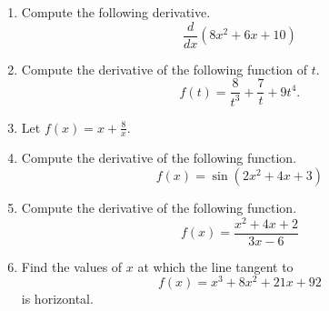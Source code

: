 \documentclass{article}
\begin{document}
\ActivityTitle[class=Calculus I, number=3, name=Differentiation I]

\begin{enumerate}
\item Compute the following derivative. \[ \frac{d}{dx} \left( 8 x^2 + 6 x + 10 \right) \]



  
\vspace{5cm}

\item Compute the derivative of the following function of $t$. \[ f(t) = \frac{8}{t^{3}} + \frac{7}{t} + 9 t^{4}. \]

  
\vspace{5cm}

\item Let $f(x) = x + \frac{8}{x}$.

  
\vspace{5cm}

\item Compute the derivative of the following function. \[ f(x) = \sin(2 x^2 + 4 x + 3) \]

  
\vspace{5cm}

\item Compute the derivative of the following function. \[ f(x) = \frac{x^2 + 4 x + 2}{3 x - 6} \]

  
\vspace{5cm}

\item Find the values of $x$ at which the line tangent to \[ f(x) = x^3 + 8 x^2 + 21 x + 92 \] is horizontal.

  
\vspace{5cm}
\end{enumerate}
\end{document}
